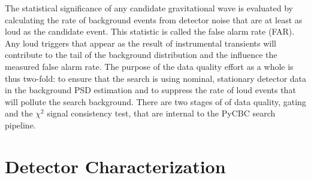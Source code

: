 The statistical significance of any candidate gravitational wave is
evaluated by calculating the rate of background events from detector noise that are at least as
loud as the candidate event. This statistic is called the false alarm rate (FAR).
Any loud triggers that appear as the result of instrumental
transients will contribute to the tail of the background distribution and
the influence the measured false alarm rate.
The purpose of the data quality effort as a whole is thus two-fold: to ensure that the
search is using nominal, stationary
detector data in the background PSD estimation and to suppress the rate of loud events
that will pollute the search background.
There are two stages of
of data quality, gating and the $\chi^{2}$ signal consistency test, that are internal to the PyCBC search
pipeline.



\section{Detector Characterization}
